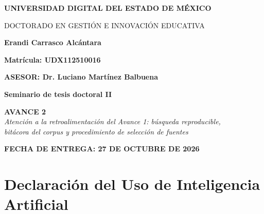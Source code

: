 \documentclass[letter,12pt]{article}
\begin{document}
\begin{titlepage}
    \centering
    \vspace*{2.0cm}

    \Huge
    \textbf{UNIVERSIDAD DIGITAL DEL ESTADO DE MÉXICO}

    \vspace{1.0cm}
    \LARGE
    DOCTORADO EN GESTIÓN E INNOVACIÓN EDUCATIVA

    \vspace{0.7cm}

    \textbf{Erandi Carrasco Alcántara}

    \vspace{0.5cm}

    \textbf{Matrícula: UDX112510016}

    \vspace{0.5cm}

    \textbf{ASESOR: Dr. Luciano Martínez Balbuena}

    \vspace{0.5cm}

    \textbf{Seminario de tesis doctoral II}

    \vspace{0.7cm}

    \large
    \textbf{AVANCE 2}\\[4pt]
    \textit{Atención a la retroalimentación del Avance 1: búsqueda reproducible,\\ bitácora del corpus y procedimiento de selección de fuentes}

    \vspace{1.0cm}

    \textbf{FECHA DE ENTREGA: 27 DE OCTUBRE DE 2026}
    \vfill
\end{titlepage}



\section*{Declaración del Uso de Inteligencia Artificial}
\end{document}
